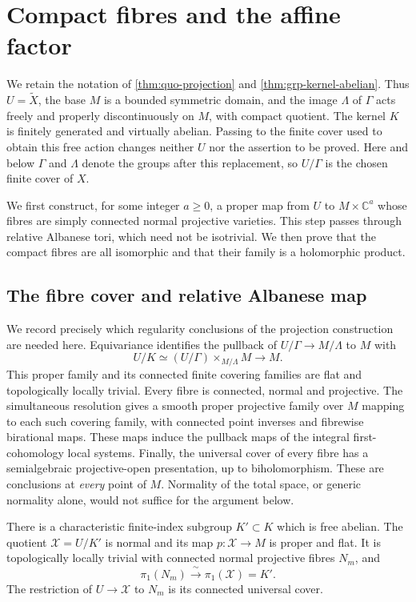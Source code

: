 \section{Compact fibres and the affine factor}
\label{sec:cmp-section}

We retain the notation of \cref{thm:quo-projection} and \cref{thm:grp-kernel-abelian}.  Thus $U=\widetilde X$, the base $M$ is a bounded symmetric domain, and the image $\Lambda$ of $\Gamma$ acts freely and properly discontinuously on $M$, with compact quotient. The kernel $K$ is finitely generated and virtually abelian.  Passing to the finite cover used to obtain this free action changes neither $U$ nor the assertion to be proved.  Here and below $\Gamma$ and $\Lambda$ denote the groups after this replacement, so $U/\Gamma$ is the chosen finite cover of $X$.

We first construct, for some integer $a\geq0$, a proper map from $U$ to $M\times\mathbb{C}^a$ whose fibres are simply connected normal projective varieties.  This step passes through relative Albanese tori, which need not be isotrivial.  We then prove that the compact fibres are all isomorphic and that their family is a holomorphic product.

\subsection{The fibre cover and relative Albanese map}

We record precisely which regularity conclusions of the projection construction are needed here.  Equivariance identifies the pullback of $U/\Gamma\to M/\Lambda$ to $M$ with
\[
       U/K\simeq (U/\Gamma)\times_{M/\Lambda}M\longrightarrow M.
\]
This proper family and its connected finite covering families are flat and topologically locally trivial.  Every fibre is connected, normal and projective.  The simultaneous resolution gives a smooth proper projective family over $M$ mapping to each such covering family, with connected point inverses and fibrewise birational maps.  These maps induce the pullback maps of the integral first-cohomology local systems.  Finally, the universal cover of every fibre has a semialgebraic projective-open presentation, up to biholomorphism.  These are conclusions at \emph{every} point of $M$. Normality of the total space, or generic normality alone, would not suffice for the argument below.

\begin{lemma}
\label{lem:cmp-characteristic}
There is a characteristic finite-index subgroup $K'\subset K$ which is free abelian.  The quotient $\mathcal{X}=U/K'$ is normal and its map $p:\mathcal{X}\to M$ is proper and flat.  It is topologically locally trivial with connected normal projective fibres $N_m$, and
\[
          \pi_1(N_m)\xrightarrow{\ \sim\ }\pi_1(\mathcal{X})=K'.
\]
The restriction of $U\to\mathcal{X}$ to $N_m$ is its connected universal cover.
\end{lemma}

